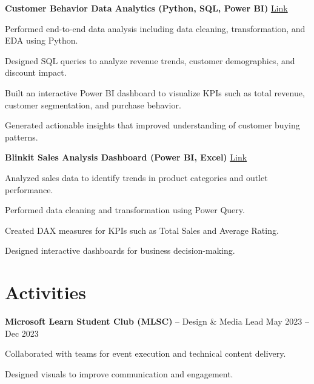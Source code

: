 \documentclass[letterpaper,10pt]{article}
\newenvironment{resume_list}{
  \vspace{-4pt}
  \begin{itemize}[leftmargin=18pt, itemsep=-3pt]
}{
  \end{itemize}
}
\begin{document}
\textbf{Customer Behavior Data Analytics (Python, SQL, Power BI)} 
\hfill \href{https://github.com/Krishna101211/Customer-behaviour-/blob/main/customer_behavior_dashboard.pdf}{Link}
\begin{resume_list}
  \item Performed end-to-end data analysis including data cleaning, transformation, and EDA using Python.
  \item Designed SQL queries to analyze revenue trends, customer demographics, and discount impact.
  \item Built an interactive Power BI dashboard to visualize KPIs such as total revenue, customer segmentation, and purchase behavior.
  \item Generated actionable insights that improved understanding of customer buying patterns.
\end{resume_list}

\textbf{Blinkit Sales Analysis Dashboard (Power BI, Excel)} 
\hfill \href{https://github.com/Krishna101211/Blinkit-sales-analysis-/blob/main/Blinkit.pdf}{Link}
\begin{resume_list}
  \item Analyzed sales data to identify trends in product categories and outlet performance.
  \item Performed data cleaning and transformation using Power Query.
  \item Created DAX measures for KPIs such as Total Sales and Average Rating.
  \item Designed interactive dashboards for business decision-making.
\end{resume_list}


\section*{Activities}
\textbf{Microsoft Learn Student Club (MLSC)} – Design \& Media Lead \hfill May 2023 -- Dec 2023
\begin{resume_list}
  \item Collaborated with teams for event execution and technical content delivery.
  \item Designed visuals to improve communication and engagement.
\end{resume_list}

\end{document}
